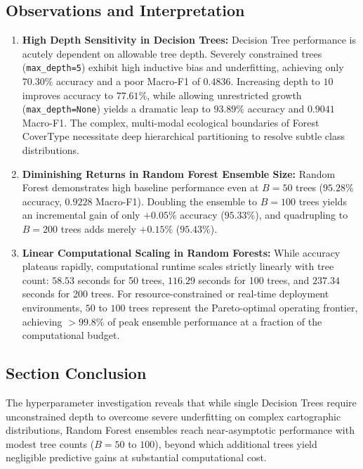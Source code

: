 \subsection{Observations and Interpretation}
\begin{enumerate}
    \item \textbf{High Depth Sensitivity in Decision Trees:} Decision Tree performance is acutely dependent on allowable tree depth. Severely constrained trees (\texttt{max\_depth=5}) exhibit high inductive bias and underfitting, achieving only $70.30\%$ accuracy and a poor Macro-F1 of $0.4836$. Increasing depth to $10$ improves accuracy to $77.61\%$, while allowing unrestricted growth (\texttt{max\_depth=None}) yields a dramatic leap to $93.89\%$ accuracy and $0.9041$ Macro-F1. The complex, multi-modal ecological boundaries of Forest CoverType necessitate deep hierarchical partitioning to resolve subtle class distributions.
    \item \textbf{Diminishing Returns in Random Forest Ensemble Size:} Random Forest demonstrates high baseline performance even at $B = 50$ trees ($95.28\%$ accuracy, $0.9228$ Macro-F1). Doubling the ensemble to $B = 100$ trees yields an incremental gain of only $+0.05\%$ accuracy ($95.33\%$), and quadrupling to $B = 200$ trees adds merely $+0.15\%$ ($95.43\%$). 
    \item \textbf{Linear Computational Scaling in Random Forests:} While accuracy plateaus rapidly, computational runtime scales strictly linearly with tree count: $58.53$ seconds for 50 trees, $116.29$ seconds for 100 trees, and $237.34$ seconds for 200 trees. For resource-constrained or real-time deployment environments, $50$ to $100$ trees represent the Pareto-optimal operating frontier, achieving $>99.8\%$ of peak ensemble performance at a fraction of the computational budget.
\end{enumerate}

\subsection{Section Conclusion}
The hyperparameter investigation reveals that while single Decision Trees require unconstrained depth to overcome severe underfitting on complex cartographic distributions, Random Forest ensembles reach near-asymptotic performance with modest tree counts ($B=50$ to $100$), beyond which additional trees yield negligible predictive gains at substantial computational cost.

